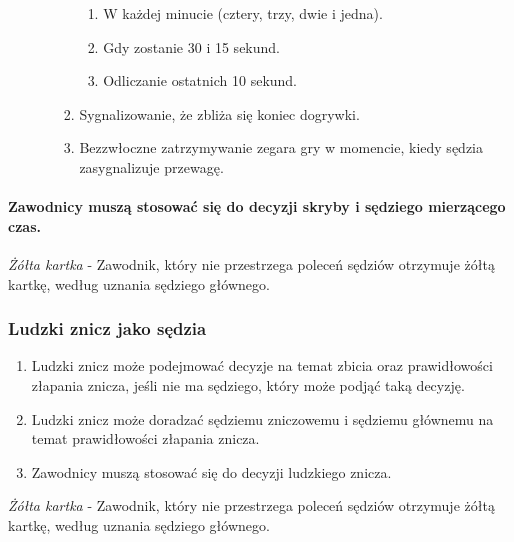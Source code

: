 \documentclass[12pt]{article}
\begin{document}
\begin{enumerate}
\begin{enumerate}
\begin{enumerate}
			                  \begin{enumerate}
				                  \item
				                        W każdej minucie (cztery, trzy, dwie i jedna).
				                  \item
				                        Gdy zostanie 30 i 15 sekund.
				                  \item
				                        Odliczanie ostatnich 10 sekund.
			                  \end{enumerate}
			            \item
			                  Sygnalizowanie, że zbliża się koniec dogrywki.
			            \item
			                  Bezzwłoczne zatrzymywanie zegara gry w momencie, kiedy sędzia
			                  zasygnalizuje przewagę.
		            \end{enumerate}
	      \end{enumerate}
\end{enumerate}

\paragraph{Zawodnicy muszą stosować się do decyzji skryby i
	sędziego mierzącego czas.}

\emph{Żółta kartka} - Zawodnik, który nie przestrzega poleceń sędziów
otrzymuje żółtą kartkę, według uznania sędziego głównego.

\subsubsection{Ludzki znicz jako sędzia}

\begin{enumerate}
	\item Ludzki znicz może podejmować decyzje na temat zbicia oraz
	      prawidłowości złapania znicza, jeśli nie ma sędziego, który może podjąć
	      taką decyzję.

	\item Ludzki znicz może doradzać sędziemu zniczowemu i sędziemu głównemu na
	      temat prawidłowości złapania znicza.

	\item Zawodnicy muszą stosować się do decyzji ludzkiego znicza.
\end{enumerate}

\emph{Żółta kartka} - Zawodnik, który nie przestrzega poleceń sędziów
otrzymuje żółtą kartkę, według uznania sędziego głównego.
\end{document}
